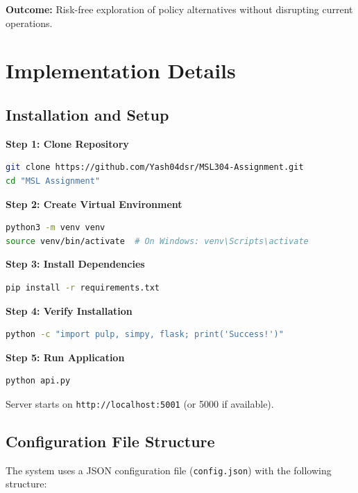 \documentclass[12pt,a4paper]{article}
\begin{document}
\textbf{Outcome:} Risk-free exploration of policy alternatives without disrupting current operations.

\newpage

\section{Implementation Details}
\label{sec:implementation}

\subsection{Installation and Setup}
\label{subsec:installation}

\textbf{Step 1: Clone Repository}
\begin{lstlisting}[language=bash]
git clone https://github.com/Yash04dsr/MSL304-Assignment.git
cd "MSL Assignment"
\end{lstlisting}

\textbf{Step 2: Create Virtual Environment}
\begin{lstlisting}[language=bash]
python3 -m venv venv
source venv/bin/activate  # On Windows: venv\Scripts\activate
\end{lstlisting}

\textbf{Step 3: Install Dependencies}
\begin{lstlisting}[language=bash]
pip install -r requirements.txt
\end{lstlisting}

\textbf{Step 4: Verify Installation}
\begin{lstlisting}[language=bash]
python -c "import pulp, simpy, flask; print('Success!')"
\end{lstlisting}

\textbf{Step 5: Run Application}
\begin{lstlisting}[language=bash]
python api.py
\end{lstlisting}

Server starts on \texttt{http://localhost:5001} (or 5000 if available).

\subsection{Configuration File Structure}

The system uses a JSON configuration file (\texttt{config.json}) with the following structure:
\end{document}
